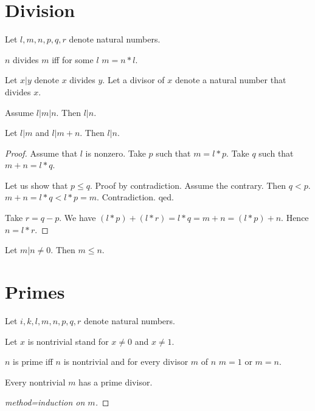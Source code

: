 \documentclass[english,11pt]{article}
\begin{document}
\section{Division}

\begin{forthel}
Let $l,m,n,p,q,r$ denote natural numbers.

\begin{definition}
$n$ divides $m$ iff for some $l$ $m = n * l$.
\end{definition}

Let $x | y$ denote $x$ divides $y$.
Let a divisor of $x$ denote a natural number that divides $x$.

\begin{lemma}
Assume $l | m | n$.
Then $l | n$.
\end{lemma}

\begin{lemma}
Let $l | m$ and $l | m + n$.
Then $l | n$.
\end{lemma}
\begin{proof}
Assume that $l$ is nonzero.
Take $p$ such that $m = l * p$.
Take $q$ such that $m + n = l * q$.

Let us show that
$p \leq q$.
Proof by contradiction.
Assume the contrary. Then $q < p$.
$m+n = l * q < l * p = m$.
Contradiction. qed.

Take $r = q - p$.
We have $(l * p) + (l * r) = l * q = m + n = (l * p) + n$.
Hence $n = l * r$.
\end{proof}

\begin{lemma}
Let $m | n \neq 0$.
Then $m \leq n$.
\end{lemma}

\end{forthel}


\section{Primes}

\begin{forthel}
Let $i,k,l,m,n,p,q,r$ denote natural numbers.

Let $x$ is nontrivial stand for $x \neq 0$ and $x \neq 1$.

\begin{definition}
$n$ is prime iff $n$ is nontrivial and
for every divisor $m$ of $n$ $m = 1$ or $m = n$.
\end{definition}

\begin{lemma}
Every nontrivial $m$ has a prime divisor.
\end{lemma}
\begin{proof}[method=induction on $m$]
\end{proof}

\end{forthel}
\end{document}
